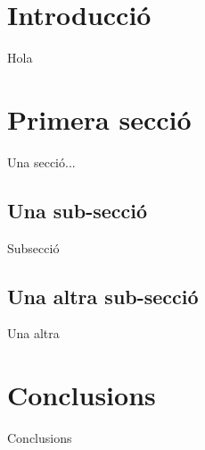 \documentclass[11pt,twoside,a4paper]{scrartcl}
\begin{document}
\maketitle %
\logoupc
\thispagestyle{empty}
\newpage

\setcounter{page}{0}
\pautes
\tableofcontents
\newpage

\section{Introducció}
Hola 

\section{Primera secció}
Una secció...

\subsection{Una sub-secció}
Subsecció
\subsection{Una altra sub-secció}
Una altra

\newpage

\section{Conclusions}
Conclusions


\newpage
\label{app:bibliography} %




\end{document}
